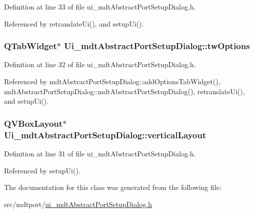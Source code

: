 Definition at line 33 of file ui\-\_\-mdt\-Abstract\-Port\-Setup\-Dialog.\-h.



Referenced by retranslate\-Ui(), and setup\-Ui().

\hypertarget{class_ui__mdt_abstract_port_setup_dialog_a8899515ed81958f46dc447309a430f6d}{
\subsubsection[{tw\-Options}]{\setlength{\rightskip}{0pt plus 5cm}Q\-Tab\-Widget$\ast$ Ui\-\_\-mdt\-Abstract\-Port\-Setup\-Dialog\-::tw\-Options}}\label{class_ui__mdt_abstract_port_setup_dialog_a8899515ed81958f46dc447309a430f6d}


Definition at line 32 of file ui\-\_\-mdt\-Abstract\-Port\-Setup\-Dialog.\-h.



Referenced by mdt\-Abstract\-Port\-Setup\-Dialog\-::add\-Options\-Tab\-Widget(), mdt\-Abstract\-Port\-Setup\-Dialog\-::mdt\-Abstract\-Port\-Setup\-Dialog(), retranslate\-Ui(), and setup\-Ui().

\hypertarget{class_ui__mdt_abstract_port_setup_dialog_a5f13974f4b030a8486d72cb6fbf9aecd}{
\subsubsection[{vertical\-Layout}]{\setlength{\rightskip}{0pt plus 5cm}Q\-V\-Box\-Layout$\ast$ Ui\-\_\-mdt\-Abstract\-Port\-Setup\-Dialog\-::vertical\-Layout}}\label{class_ui__mdt_abstract_port_setup_dialog_a5f13974f4b030a8486d72cb6fbf9aecd}


Definition at line 31 of file ui\-\_\-mdt\-Abstract\-Port\-Setup\-Dialog.\-h.



Referenced by setup\-Ui().



The documentation for this class was generated from the following file\-:\begin{DoxyCompactItemize}
\item 
src/mdtport/\hyperlink{ui__mdt_abstract_port_setup_dialog_8h}{ui\-\_\-mdt\-Abstract\-Port\-Setup\-Dialog.\-h}\end{DoxyCompactItemize}

